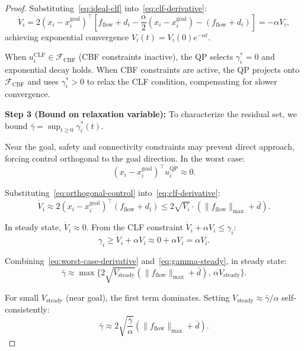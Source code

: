 \documentclass[conference]{IEEEconf}
\theoremstyle{plain}
\begin{document}
\begin{proof}
Substituting~\eqref{eq:ideal-clf} into~\eqref{eq:clf-derivative}:
\begin{equation}
\dot{V}_i = 2(x_i-x_i^{\mathrm{goal}})^\top\left[f_{\mathrm{flow}}+d_i-\frac{\alpha}{2}(x_i-x_i^{\mathrm{goal}})-(f_{\mathrm{flow}}+d_i)\right] = -\alpha V_i,
\label{eq:exponential-clf}
\end{equation}
achieving exponential convergence $V_i(t)=V_i(0)e^{-\alpha t}$.

When $u_i^{\mathrm{CLF}}\in\mathcal{F}_{\mathrm{CBF}}$ (CBF constraints inactive), the QP selects $\gamma_i^*=0$ and exponential decay holds. When CBF constraints are active, the QP projects onto $\mathcal{F}_{\mathrm{CBF}}$ and uses $\gamma_i^*>0$ to relax the CLF condition, compensating for slower convergence.

\medskip
\noindent\textbf{Step 3 (Bound on relaxation variable):}
To characterize the residual set, we bound $\bar{\gamma}=\sup_{t\ge 0}\gamma_i^*(t)$.

Near the goal, safety and connectivity constraints may prevent direct approach, forcing control orthogonal to the goal direction. In the worst case:
\begin{equation}
(x_i-x_i^{\mathrm{goal}})^\top u_i^{\mathrm{QP}} \approx 0.
\label{eq:orthogonal-control}
\end{equation}

Substituting~\eqref{eq:orthogonal-control} into~\eqref{eq:clf-derivative}:
\begin{equation}
\dot{V}_i \approx 2(x_i-x_i^{\mathrm{goal}})^\top(f_{\mathrm{flow}}+d_i) \le 2\sqrt{V_i}\cdot(\|f_{\mathrm{flow}}\|_{\max}+\bar{d}).
\label{eq:worst-case-derivative}
\end{equation}

In steady state, $\dot{V}_i\approx 0$. From the CLF constraint $\dot{V}_i+\alpha V_i\le\gamma_i$:
\begin{equation}
\gamma_i \ge \dot{V}_i+\alpha V_i \approx 0+\alpha V_i = \alpha V_i.
\label{eq:gamma-steady}
\end{equation}

Combining~\eqref{eq:worst-case-derivative} and~\eqref{eq:gamma-steady}, in steady state:
\begin{equation}
\bar{\gamma} \approx \max\{2\sqrt{V_{\mathrm{steady}}}(\|f_{\mathrm{flow}}\|_{\max}+\bar{d}),\,\alpha V_{\mathrm{steady}}\}.
\label{eq:gamma-bound}
\end{equation}

For small $V_{\mathrm{steady}}$ (near goal), the first term dominates. Setting $V_{\mathrm{steady}}\approx\bar{\gamma}/\alpha$ self-consistently:
\begin{equation}
\bar{\gamma} \approx 2\sqrt{\frac{\bar{\gamma}}{\alpha}}(\|f_{\mathrm{flow}}\|_{\max}+\bar{d}).
\label{eq:self-consistent}
\end{equation}


\end{proof}
\end{document}
